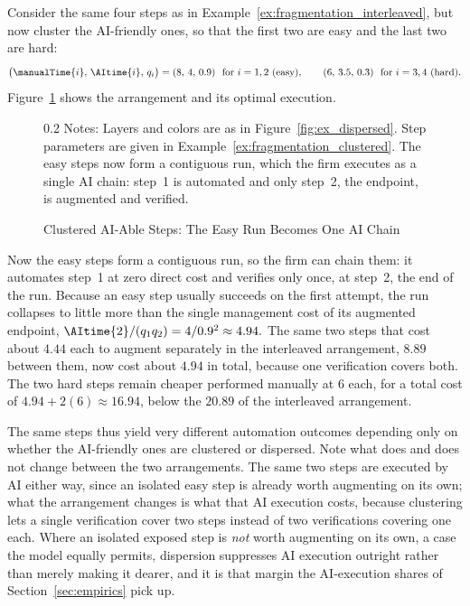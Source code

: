\begin{example}
\label{ex:fragmentation_clustered}
Consider the same four steps as in Example~\ref{ex:fragmentation_interleaved}, but now cluster the AI-friendly ones, so that the first two are easy and the last two are hard:
\[ \bigl(\manualTime{i},\, \AItime{i},\, q_i\bigr) = (8,\,4,\,0.9) \ \text{ for $i = 1, 2$ (easy)}, \qquad (6,\,3.5,\,0.3) \ \text{ for $i = 3, 4$ (hard)}. \]
Figure~\ref{fig:ex_clustered} shows the arrangement and its optimal execution.
\begin{figure}[!t]
\caption{Clustered AI-Able Steps: The Easy Run Becomes One AI Chain}
\label{fig:ex_clustered}
\centering

\par\vspace{\fignotesskip}
\begin{minipage}{1\linewidth}
\begin{spacing}{0.2}
{\fontsize{9.5pt}{10pt}\selectfont Notes: Layers and colors are as in Figure~\ref{fig:ex_dispersed}. Step parameters are given in Example~\ref{ex:fragmentation_clustered}. The easy steps now form a contiguous run, which the firm executes as a single AI chain: step~1 is automated and only step~2, the endpoint, is augmented and verified.}
\end{spacing}
\end{minipage}
\end{figure}

Now the easy steps form a contiguous run, so the firm can chain them: it automates step~1 at zero direct cost and verifies only once, at step~2, the end of the run.
Because an easy step usually succeeds on the first attempt, the run collapses to little more than the single management cost of its augmented endpoint, $\AItime{2}/(q_1 q_2) = 4/0.9^2 \approx 4.94.$
The same two steps that cost about $4.44$ each to augment separately in the interleaved arrangement, $8.89$ between them, now cost about $4.94$ in total, because one verification covers both.
The two hard steps remain cheaper performed manually at $6$ each, for a total cost of $4.94 + 2(6) \approx 16.94$, below the $20.89$ of the interleaved arrangement.
\end{example}

The same steps thus yield very different automation outcomes depending only on whether the AI-friendly ones are clustered or dispersed.
Note what does and does not change between the two arrangements.
The same two steps are executed by AI either way, since an isolated easy step is already worth augmenting on its own; what the arrangement changes is what that AI execution costs, because clustering lets a single verification cover two steps instead of two verifications covering one each.
Where an isolated exposed step is \emph{not} worth augmenting on its own, a case the model equally permits, dispersion suppresses AI execution outright rather than merely making it dearer, and it is that margin the AI-execution shares of Section~\ref{sec:empirics} pick up.

